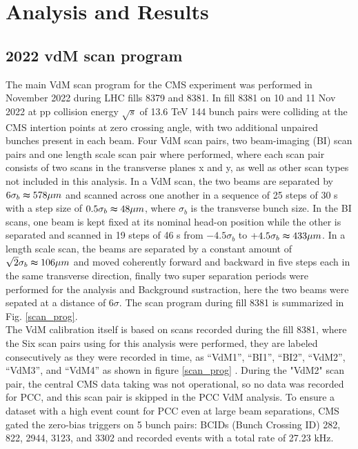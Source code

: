 \chapter{Analysis and Results}


\section{2022 vdM scan program}

The main VdM scan program for the CMS experiment was performed in November 2022 during LHC fills 8379 and 8381. In fill 8381 on 10 and  11 Nov 2022 at pp collision energy $\sqrt{s}$ of 13.6 TeV  144 bunch pairs were colliding at the CMS intertion points at zero crossing angle, with two additional unpaired bunches present in each beam. Four VdM scan pairs, two beam-imaging (BI) scan pairs and one length scale scan pair where performed, where each scan pair consists of two scans in the transverse planes x and y, as well as other scan types not included in this analysis. In a VdM scan, the two beams are separated by $6\sigma_{b} \thickapprox 578\mu m$ and scanned across one another in a sequence of 25 steps of 30 s with a step size of $0.5\sigma_{b} \thickapprox 48 \mu m$, where $\sigma_{b}$ is the transverse bunch size. In the BI scans, one beam is kept fixed at its nominal head-on position while the other is separated and scanned in 19 steps of 46 s from $-4.5\sigma_{b}$ to $+4.5\sigma_{b} \thickapprox 433 \mu m$. In a length scale scan, the beams are separated by a constant amount of $\sqrt{2} \sigma_{b} \thickapprox  106 \mu m$  and moved coherently forward and backward in five steps each in the same transverse direction, finally two super separation periods were performed for the analysis and Background sustraction, here the two beams were sepated at a distance of $6\sigma$.  The scan program during fill 8381 is summarized in Fig. \ref{scan_prog}.\\

The VdM calibration itself is based on scans recorded during the fill 8381, where the  Six scan pairs using for  this analysis were performed, they are labeled consecutively as they were recorded in time, as “VdM1”, “BI1”, “BI2”, “VdM2”, “VdM3”, and “VdM4” as shown in figure \ref{scan_prog} . During the "VdM2" scan pair, the central CMS data taking was not operational, so no data was recorded for PCC, and this scan pair is skipped in the PCC VdM analysis. To ensure a dataset with a high event count for PCC even at large beam separations, CMS gated the zero-bias triggers on 5 bunch pairs: BCIDs (Bunch Crossing ID) 282, 822, 2944, 3123, and 3302 and recorded events with a total rate of 27.23 kHz.\\

